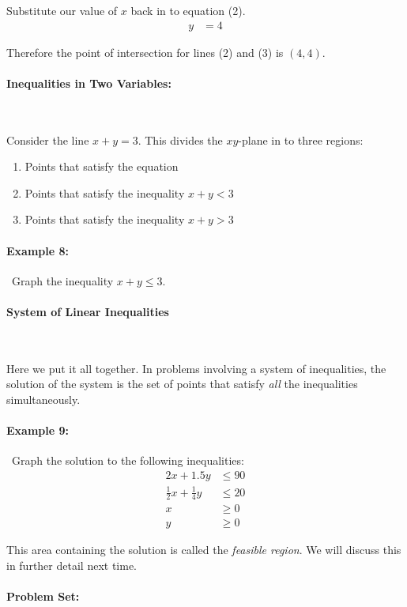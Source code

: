 \documentclass[english,12pt]{article}
\theoremstyle{plain}
\theoremstyle{definition}
\theoremstyle{definition} %
\newcommand{\enum}[1]{\begin{enumerate} #1 \end{enumerate}}
\begin{document}
Substitute our value of $x$ back in to equation (2).
\begin{align*}
y&=4
\end{align*}

Therefore the point of intersection for lines (2) and (3) is $(4,4)$.

\paragraph{Inequalities in Two Variables:}\

Consider the line $x+y=3$.  This divides the $xy$-plane in to three regions:
\enum{
\item Points that satisfy the equation
\item Points that satisfy the inequality $x+y<3$
\item Points that satisfy the inequality $x+y>3$
}

\paragraph{Example 8:}\
Graph the inequality $x+y\le 3$.
\vspace{30 mm}


\paragraph{System of Linear Inequalities}\

Here we put it all together.  In problems involving a system of inequalities, the solution of the system is the
set of points that satisfy \emph{all} the inequalities simultaneously.

\paragraph{Example 9:}\
Graph the solution to the following inequalities:
\begin{align*}
2x+1.5y&\le 90\\
\frac{1}{2}x+\frac{1}{4}y&\le 20\\
x&\ge 0\\
y&\ge 0
\end{align*}
\vspace{30mm}

This area containing the solution is called the \emph{feasible region}.  We will discuss this in further detail next time.


\pagebreak

\paragraph{Problem Set:}\
\end{document}

